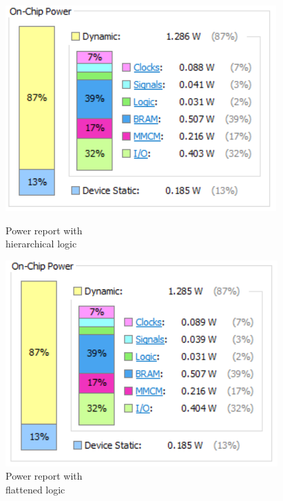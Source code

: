 \begin{figure}[H]
	\centering
	\begin{minipage}{.5\textwidth}
		\centering
		\includegraphics[width=.9\linewidth]{IMG/ch4/FirmwareNOFLAT/POWER}
		\caption{Power report with \\hierarchical logic}
		\label{fig:noflatpower}
	\end{minipage}%
	\begin{minipage}{.5\textwidth}
		\centering
		\includegraphics[width=.9\linewidth]{IMG/ch4/FirmwareFLAT/POWER}
		\caption{Power report with \\flattened logic}
		\label{fig:flatpower}
	\end{minipage}
\end{figure}
